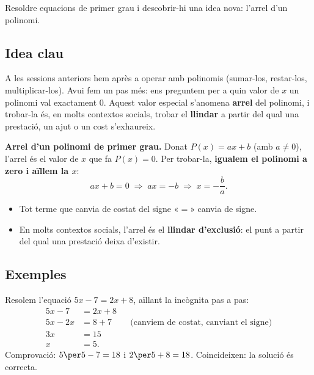 %
{Resoldre equacions de primer grau i descobrir-hi una idea nova: l'arrel d'un polinomi.}

\subsection{Idea clau}

A les sessions anteriors hem après a operar amb polinomis (sumar-los, restar-los,
multiplicar-los). Avui fem un pas més: ens preguntem per a quin valor de $x$ un
polinomi val exactament $0$. Aquest valor especial s'anomena \textbf{arrel} del
polinomi, i trobar-la és, en molts contextos socials, trobar el \textbf{llindar}
a partir del qual una prestació, un ajut o un cost s'exhaureix.

\begin{idea}
\textbf{Arrel d'un polinomi de primer grau.}
Donat $P(x)=ax+b$ (amb $a\neq 0$), l'arrel és el valor de $x$ que fa $P(x)=0$.
Per trobar-la, \textbf{igualem el polinomi a zero i aïllem la $x$}:
\[
ax+b=0 \;\Longrightarrow\; ax=-b \;\Longrightarrow\; x=-\frac{b}{a}.
\]
\begin{itemize}[leftmargin=1.4em, itemsep=2pt]
  \item Tot terme que canvia de costat del signe «$=$» canvia de signe.
  \item En molts contextos socials, l'arrel és el \textbf{llindar d'exclusió}:
        el punt a partir del qual una prestació deixa d'existir.
\end{itemize}
\end{idea}

\subsection{Exemples}

\begin{exemple}
Resolem l'equació $5x-7=2x+8$, aïllant la incògnita pas a pas:
\begin{align*}
5x-7&=2x+8\\
5x-2x&=8+7 &&\text{(canviem de costat, canviant el signe)}\\
3x&=15\\
x&=5.
\end{align*}
Comprovació: $5\per 5-7=18$ i $2\per 5+8=18$. Coincideixen: la solució és correcta.
\end{exemple}


